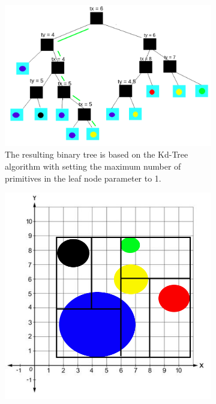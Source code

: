 \documentclass[11pt,a4paper]{article}
\begin{document}
\begin{figure}[H]
\begin{subfigure}[b]{0.6\textwidth}
         \includegraphics[width=\textwidth]{images/kdtree/visaul_tree_11_green.png}
         \caption{The resulting binary tree is based on the Kd-Tree algorithm with setting the maximum number of primitives in the leaf node parameter to 1.}
         \label{fig:pi_5000}
     \end{subfigure}
     \hfill
     \begin{subfigure}[b]{0.3\textwidth}
         \centering
         \captionsetup{justification=centering}
         \includegraphics[width=\textwidth]{images/kdtree/visaul_scene_2.png}

\end{subfigure}
\end{figure}
\end{document}
